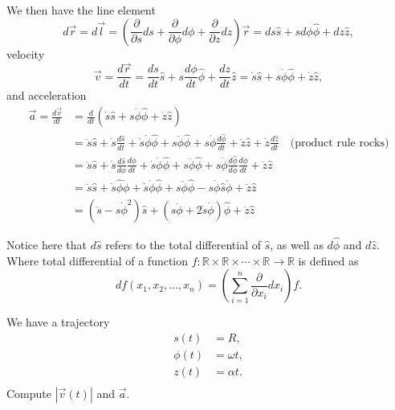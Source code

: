 \begin{cor}
We then have the line element
\[ d \vec{r} = d \vec{l} = \left( \frac{\partial}{\partial s} ds +
\frac{\partial}{\partial \phi} d \phi + \frac{\partial}{\partial z} dz
\right) \vec{r} = ds \hat{s} + s d \phi \hat{\phi} + dz \hat{z}, \]
velocity
\[ \vec{v} = \frac{d \vec{r}}{dt} = \frac{ds}{dt} \hat{s} + s \frac{d
\phi}{dt} \hat{\phi} + \frac{dz}{dt} \hat{z} = \dot{s} \hat{s} + s
\dot{\phi} \hat{\phi} + \dot{z} \hat{z}, \]
and acceleration
\[ \begin{aligned}
\vec{a} = \frac{d \vec{v}}{dt} &= \frac{d}{dt} \left( \dot{s} \hat{s}
+ s \dot{\phi} \hat{\phi} + \dot{z} \hat{z} \right) \\
&= \ddot{s} \hat{s} + \dot{s} \frac{d \hat{s}}{dt}  + \dot{s} \dot{\phi}
\hat{\phi} + s \ddot{\phi} \hat{\phi} + s \dot{\phi} \frac{d
\hat{\phi}}{dt} + \ddot{z} \hat{z} + \dot{z} \frac{d \hat{z}}{dt} \quad
\textrm{(product rule rocks)} \\
&= \ddot{s} \hat{s} + \dot{s} \frac{d \hat{s}}{d \phi}\frac{d \phi}{dt}
+ \dot{s} \dot{\phi} \hat{\phi} + s \ddot{\phi} \hat{\phi} + s
\dot{\phi} \frac{d \hat{\phi}}{d \phi} \frac{d \phi}{dt} + \ddot{z}
\hat{z} \\
&= \ddot{s} \hat{s} + \dot{s} \hat{\phi} \dot{\phi} + \dot{s} \dot{\phi}
\hat{\phi} + s \ddot{\phi} \hat{\phi} - s \dot{\phi} \hat{s} \dot{\phi}
+ \ddot{z} \hat{z} \\
&= \left( \ddot{s} - s \dot{\phi}^2 \right) \hat{s} + \left( s
\ddot{\phi} + 2 \dot{s} \dot{\phi} \right) \hat{\phi} + \ddot{z} \hat{z}
\end{aligned} \]
\end{cor}

\begin{rem}
Notice here that $d \hat{s}$ refers to the total differential of
$\hat{s}$, as well as $d \hat{\phi}$ and $d \hat{z}$. Where total
differential of a function $f : \mathbb{R} \times \mathbb{R} \times
\cdots \times \mathbb{R} \to \mathbb{R}$ is defined as
\[ df(x_1, x_2, \dots, x_n) = \left( \sum_{i = 1}^n
\frac{\partial}{\partial x_i} d x_i \right) f. \]
\end{rem}

\begin{ex}
We have a trajectory
\[ \begin{aligned}
s(t) &= R, \\
\phi(t) &= \omega t, \\
z(t) &= \alpha t. \\
\end{aligned} \]
Compute $|\vec{v}(t)|$ and $\vec{a}$.
\end{ex}

